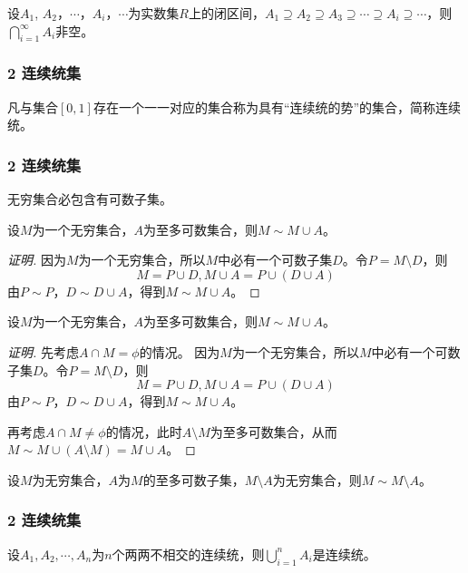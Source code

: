 \documentclass{beamer}
\begin{document}
\begin{CJK*}{UTF8}{gbsn}
\begin{frame}[t]
  设$A_1$, $A_2$，$\cdots$，$A_i$，$\cdots$为实数集$R$上的闭区间，$A_1\supseteq A_2 \supseteq A_3 \supseteq \cdots \supseteq A_i \supseteq \cdots$，则$\bigcap_{i=1}^{\infty}A_i$非空。
\end{frame}

\begin{frame}[t]
  \frametitle{2 连续统集}
  \begin{Def}
    凡与集合$[0,1]$存在一个一一对应的集合称为具有“连续统的势”的集合，简称\alert{连续统}。
  \end{Def}
\end{frame}

\begin{frame}[t]
  \frametitle{2 连续统集}
  \begin{Thm}
    无穷集合必包含有可数子集。
  \end{Thm}
\end{frame}
\begin{frame}[t]
  \begin{Thm}
    设$M$为一个无穷集合，$A$为至多可数集合，则$M \sim M \cup A$。
  \end{Thm}\pause
  \begin{proof}[证明]
    因为$M$为一个无穷集合，所以$M$中必有一个可数子集$D$。令$P=M\setminus D$，则
    \[M=P\cup D, M\cup A = P\cup (D\cup A)\]
    由$P\sim P$，$D\sim D\cup A$，得到$M\sim M\cup A$。
  \end{proof}
\end{frame}
\begin{frame}[t]
  \begin{Thm}
    设$M$为一个无穷集合，$A$为至多可数集合，则$M \sim M \cup A$。
  \end{Thm}
  \begin{proof}[证明]
    先考虑$A\cap M=\phi$的情况。
    因为$M$为一个无穷集合，所以$M$中必有一个可数子集$D$。令$P=M\setminus D$，则
    \[M=P\cup D, M\cup A = P\cup (D\cup A)\]
    由$P\sim P$，$D\sim D\cup A$，得到$M\sim M\cup A$。

    再考虑$A\cap M\neq \phi$的情况，此时$A\setminus M$为至多可数集合，从而$M\sim M\cup(A\setminus M)=M\cup A$。
  \end{proof}
\end{frame}

\begin{frame}[t]
  \begin{Thm}
    设$M$为无穷集合，$A$为$M$的至多可数子集，$M\setminus A$为无穷集合，则$M \sim M\setminus A$。
  \end{Thm}
\end{frame}
\begin{frame}
  \frametitle{2 连续统集}
  \begin{Thm}
    设$A_1, A_2, \cdots, A_n$为$n$个两两不相交的连续统，则$\bigcup_{i=1}^nA_i$是连续统。
  \end{Thm}
\end{frame}


\end{CJK*}
\end{document}
